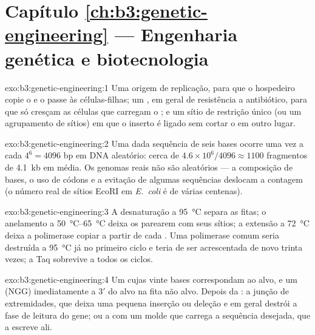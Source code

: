 \section*{Capítulo \ref{ch:b3:genetic-engineering} --- Engenharia genética e biotecnologia}

\begin{solution}{exo:b3:genetic-engineering:1}
Uma origem de replicação, para que o hospedeiro copie o  e o
passe às células-filhas; um , em geral de
resistência a antibiótico, para que só cresçam as células que carregam
o ; e um sítio de restrição único (ou um agrupamento de
sítios) em que o inserto é ligado sem cortar o  em outro
lugar.
\end{solution}

\begin{solution}{exo:b3:genetic-engineering:2}
Uma dada sequência de seis bases ocorre uma vez a cada $4^{6} = 4096$
bp em DNA aleatório: cerca de $4.6\times 10^{6}/4096 \approx 1100$
fragmentos de \qty{4.1}{kb} em média. Os genomas reais não são
aleatórios --- a composição de bases, o uso de códons e a evitação de
algumas sequências deslocam a contagem (o número real de sítios EcoRI
em \emph{E.~coli} é de várias centenas).
\end{solution}

\begin{solution}{exo:b3:genetic-engineering:3}
A desnaturação a \qty{95}{\celsius} separa as fitas; o anelamento a
\qtyrange{50}{65}{\celsius} deixa os  parearem com seus
sítios; a extensão a \qty{72}{\celsius} deixa a polimerase copiar a
partir de cada . Uma polimerase comum seria destruída a
\qty{95}{\celsius} já no primeiro ciclo e teria de ser acrescentada de
novo trinta vezes; a Taq sobrevive a todos os ciclos.
\end{solution}

\begin{solution}{exo:b3:genetic-engineering:4}
Um  cujas vinte bases correspondam ao alvo, e um  (NGG)
imediatamente a 3$'$ do alvo na fita não alvo. Depois da : a junção de extremidades, que deixa uma pequena inserção ou
deleção e em geral destrói a fase de leitura do gene; ou a  com um molde que carrega a sequência desejada, que a escreve
ali.
\end{solution}

